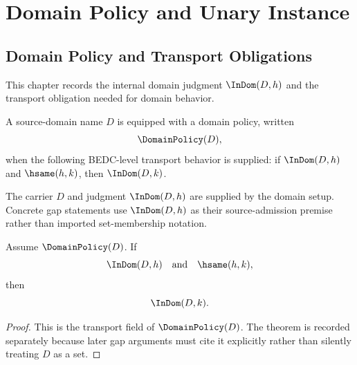 \chapter{Domain Policy and Unary Instance}
\label{ch:proof-obligations-domain-policy}

\section{Domain Policy and Transport Obligations}
\label{sec:po-domain-policy-abstract}

This chapter records the internal domain judgment $\InDom(D,h)$ and the transport obligation needed for domain behavior.

\begin{definition}
\label{def:domain-policy}
A source-domain name $D$ is equipped with a domain policy, written
$$
  \DomainPolicy(D),
$$
when the following BEDC-level transport behavior is supplied: if $\InDom(D,h)$ and $\hsame(h,k)$, then $\InDom(D,k)$.
\end{definition}

The carrier $D$ and judgment $\InDom(D,h)$ are supplied by the domain setup. Concrete gap statements use $\InDom(D,h)$ as their source-admission premise rather than imported set-membership notation.

\begin{theorem}
\label{thm:domain-transport}
Assume \(\DomainPolicy(D)\). If
$$
  \InDom(D,h)
  \quad\text{and}\quad
  \hsame(h,k),
$$
then
$$
  \InDom(D,k).
$$
\end{theorem}

\begin{proof}
This is the transport field of \(\DomainPolicy(D)\). The theorem is recorded separately because later gap arguments must cite it explicitly rather than silently treating \(D\) as a set.
\end{proof}

